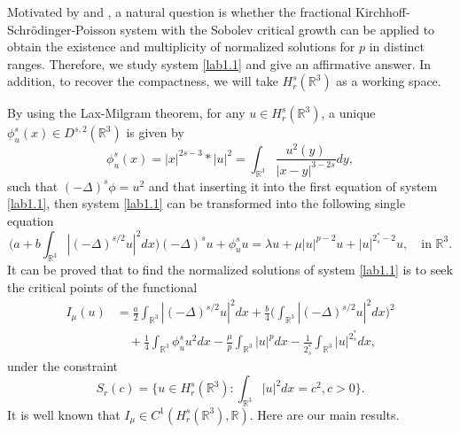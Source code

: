 Motivated by \cite{H2588} and \cite{wang1388}, a natural question is whether the
fractional Kirchhoff-Schr\"odinger-Poisson system with the Sobolev critical growth can
be applied to obtain the  existence and multiplicity   of normalized solutions for $p$
in distinct ranges.
Therefore, we study system \eqref{lab1.1} and give an affirmative answer.
In addition, to recover the compactness, we will take $H^s_r(\mathbb{R}^3)$ as a
working space.

By using the Lax-Milgram theorem, for any $u\in H^s_r(\mathbb{R}^3)$, a unique
$\phi ^s_u(x)\in D^{s,2}(\mathbb{R}^3)$ is given by
\[ \label{lab1.4}
\phi ^s_u(x)=|x|^{2s-3}\ast|u|^2=\int_{\mathbb{R}^3}\frac{u^2(y)}{|x-y|^{3-2s}}dy,
\]
such that $(-\Delta)^s\phi =u^2$ and that inserting it into the first equation of
system \eqref{lab1.1}, then system \eqref{lab1.1} can be transformed into the following
single equation
\begin{equation}\label{lab1.5}
\Big(a+b\int_{\mathbb{R}^3}|(-\Delta)^{s/2}u|^2dx\Big)(-\Delta)^s u
 + \phi^s_u u= \lambda u+ \mu|u|^{p-2}u+ |u|^{2^*_s-2}u, \quad\text{in }\mathbb{R}^3.
\end{equation}
It can be proved  that to find the normalized solutions of system \eqref{lab1.1}
is to seek the critical points of the functional
\begin{align*}
  I_\mu(u)
&=\frac{a}{2}\int_{\mathbb{R}^3}|(-\Delta)^{s/2}u|^2dx
  +\frac{b}{4}\Big(\int_{\mathbb{R}^3}|(-\Delta)^{s/2}u|^2dx\Big)^2\\
&\quad +\frac{1}{4}\int_{\mathbb{R}^3}\phi ^s_uu^2dx
 -\frac{\mu}{p}\int _{\mathbb{R}^3}|u|^pdx
 -\frac{1}{2^*_s}\int _{\mathbb{R}^3}|u|^{2^*_s}dx,
\end{align*}
under the constraint
\[ \label{1.8}
S_r(c)=\Big\{u \in H^s_r(\mathbb{R}^3):\int_{\mathbb{R}^3}|u|^2dx=c^2,c>0\Big\}.
\]
It is well known that $I_\mu\in {C}^1(H^s_r(\mathbb{R}^3), \mathbb{R})$.
Here are our main results.

